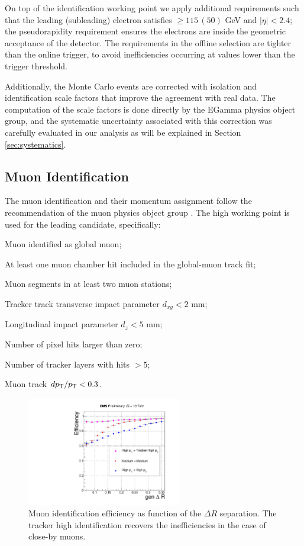 On top of the identification working point we apply additional requirements such that the leading (subleading) electron satisfies \ptrans  $\geq 115 \, (50)$  GeV and $|\eta| < 2.4$; the pseudorapidity requirement ensures the electrons are inside the geometric acceptance of the detector. The \ptrans requirements in the offline selection are tighter than the online trigger, to avoid inefficiencies occurring at values lower than the trigger threshold.

Additionally, the Monte Carlo events are corrected with isolation and identification scale factors that improve the agreement with real data. The computation of the scale factors is done directly by the EGamma physics object group, and the systematic uncertainty associated with this correction was carefully evaluated in our analysis as will be explained in Section \ref{sec:systematics}.

\subsection*{Muon Identification}
The muon identification and their momentum assignment follow the recommendation of the muon physics object group \cite{muonPOG}. The high \ptrans working point is used for the leading candidate, specifically:
\begin{compact_itemize}
\item Muon identified as global muon;
\item At least one muon chamber hit included in the global-muon track fit;
\item Muon segments in at least two muon stations;
\item Tracker track transverse impact parameter $d_{xy} < 2$ mm;
\item Longitudinal impact parameter $d_z < 5$ mm;
\item Number of pixel hits larger than zero;
\item Number of tracker layers with hits $> 5$;
\item Muon track $dp_{\rm T} / p_{\rm T} < 0.3$.
\end{compact_itemize}

\begin{figure}[!h]
\centering
\includegraphics[width=0.6\textwidth]{figures/objects/id-eff-dR-mu.pdf}
\caption[Muon identification efficiency]{Muon identification efficiency as function of the $\Delta R$ separation. The tracker high \ptrans identification recovers the inefficiencies in the case of close-by muons.}
\label{fig:muid}
\end{figure}

